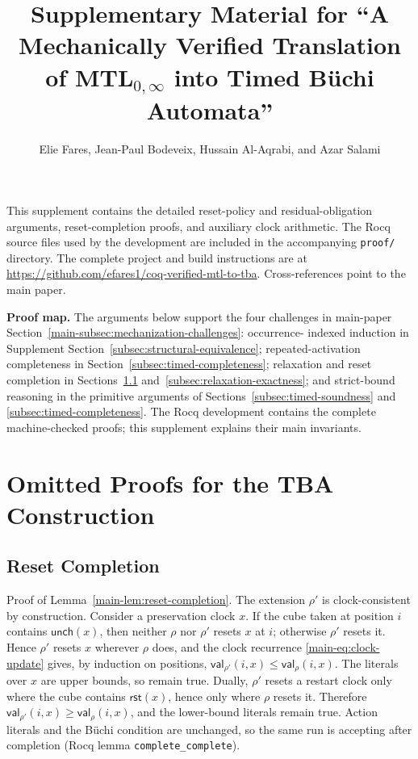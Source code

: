 \documentclass[10pt,journal,compsoc]{IEEEtran}
\title{Supplementary Material for ``A Mechanically Verified Translation of MTL$_{0,\infty}$ into Timed B\"uchi Automata''}
\author{Elie Fares, Jean-Paul Bodeveix, Hussain Al-Aqrabi, and Azar Salami}
\newcommand{\Reset}{\mathsf{rst}}
\newcommand{\Unch}{\mathsf{unch}}
\newcommand{\CVal}{\mathsf{val}}
\begin{document}
\maketitle

This supplement contains the detailed reset-policy and residual-obligation
arguments, reset-completion proofs, and auxiliary clock arithmetic. The
Rocq source files used by the development are included in the accompanying
\texttt{proof/} directory. The complete project and build instructions are at
\url{https://github.com/efares1/coq-verified-mtl-to-tba}. Cross-references
point to the main paper.

\noindent\textbf{Proof map.} The arguments below support the four challenges
in main-paper Section~\ref{main-subsec:mechanization-challenges}: occurrence-
indexed induction in Supplement Section~\ref{subsec:structural-equivalence};
repeated-activation completeness in Section~\ref{subsec:timed-completeness};
relaxation and reset completion in Sections~\ref{subsec:reset-completion-proof}
and~\ref{subsec:relaxation-exactness}; and strict-bound reasoning in the
primitive arguments of Sections~\ref{subsec:timed-soundness} and
\ref{subsec:timed-completeness}. The Rocq development contains the complete
machine-checked proofs; this supplement explains their main invariants.

\section{Omitted Proofs for the TBA Construction}
\label{sec:supp-proofs}

\subsection{Reset Completion}
\label{subsec:reset-completion-proof}
Proof of Lemma~\ref{main-lem:reset-completion}. The extension $\rho'$ is
clock-consistent by construction. Consider a preservation clock $x$. If the
cube taken at position $i$ contains $\Unch(x)$, then neither $\rho$ nor
$\rho'$ resets $x$ at $i$; otherwise $\rho'$ resets it. Hence $\rho'$ resets
$x$ wherever $\rho$ does, and the clock recurrence
\eqref{main-eq:clock-update} gives, by induction on positions,
$\CVal_{\rho'}(i,x)\le\CVal_\rho(i,x)$. The literals over $x$ are upper
bounds, so remain true. Dually, $\rho'$ resets a restart clock only where
the cube contains $\Reset(x)$, hence only where $\rho$ resets it. Therefore
$\CVal_{\rho'}(i,x)\ge\CVal_\rho(i,x)$, and the lower-bound literals
remain true. Action literals and the B\"uchi condition are unchanged, so the
same run is accepting after completion (Rocq lemma
\texttt{complete\_complete}).
\end{document}

